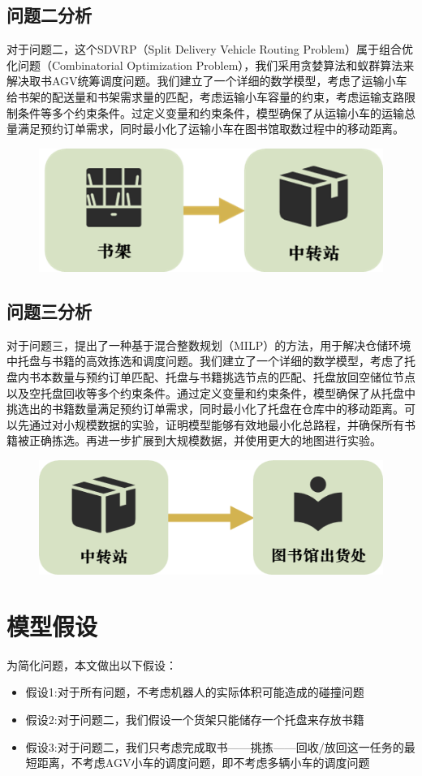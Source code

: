 \documentclass[withoutpreface,bwprint]{thesis-config}
\begin{document}
\subsection{问题二分析}	
对于问题二，这个SDVRP（Split Delivery Vehicle Routing Problem）属于组合优化问题（Combinatorial Optimization Problem），我们采用贪婪算法和蚁群算法来解决取书AGV统筹调度问题。我们建立了一个详细的数学模型，考虑了运输小车给书架的配送量和书架需求量的匹配，考虑运输小车容量的约束，考虑运输支路限制条件等多个约束条件。过定义变量和约束条件，模型确保了从运输小车的运输总量满足预约订单需求，同时最小化了运输小车在图书馆取数过程中的移动距离。
\begin{figure}[!hbtp]
    \centering
    \includegraphics[width=0.5\linewidth]{figures/str-2.png}
\end{figure}
\subsection{问题三分析}	
对于问题三，提出了一种基于混合整数规划（MILP）的方法，用于解决仓储环境中托盘与书籍的高效拣选和调度问题。我们建立了一个详细的数学模型，考虑了托盘内书本数量与预约订单匹配、托盘与书籍挑选节点的匹配、托盘放回空储位节点以及空托盘回收等多个约束条件。通过定义变量和约束条件，模型确保了从托盘中挑选出的书籍数量满足预约订单需求，同时最小化了托盘在仓库中的移动距离。可以先通过对小规模数据的实验，证明模型能够有效地最小化总路程，并确保所有书籍被正确拣选。再进一步扩展到大规模数据，并使用更大的地图进行实验。
\begin{figure}[!htbp]
    \centering
    \includegraphics[width=0.5\linewidth]{figures/str-3.png}
\end{figure}
\section{模型假设}

\par 为简化问题，本文做出以下假设：

\begin{itemize}[itemindent=2em]
\item 假设1:对于所有问题，不考虑机器人的实际体积可能造成的碰撞问题
\item 假设2:对于问题二，我们假设一个货架只能储存一个托盘来存放书籍
\item 假设3:对于问题二，我们只考虑完成取书——挑拣——回收/放回这一任务的最短距离，不考虑AGV小车的调度问题，即不考虑多辆小车的调度问题
\end{itemize}
\end{document}
